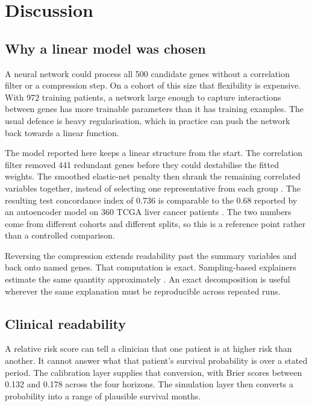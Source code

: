 \documentclass[10pt,a4paper]{article}
\begin{document}
\section{Discussion}

\subsection{Why a linear model was chosen}

A neural network could process all 500 candidate genes without a correlation
filter or a compression step. On a cohort of this size that flexibility is
expensive. With 972 training patients, a network large enough to capture
interactions between genes has more trainable parameters than it has training
examples. The usual defence is heavy regularisation, which in practice can push
the network back towards a linear function.

The model reported here keeps a linear structure from the start. The correlation
filter removed 441 redundant genes before they could destabilise the fitted
weights. The smoothed elastic-net penalty then shrank the remaining correlated
variables together, instead of selecting one representative from each group
\citep{zou2005regularization}. The resulting test concordance index of 0.736 is
comparable to the 0.68 reported by an autoencoder model on 360 TCGA liver cancer
patients \citep{chaudhary2018deep}. The two numbers come from different cohorts
and different splits, so this is a reference point rather than a controlled
comparison.

Reversing the compression extends readability past the summary variables and
back onto named genes. That computation is exact. Sampling-based explainers
estimate the same quantity approximately \citep{lundberg2017unified,
ribeiro2016why}. An exact decomposition is useful wherever the same
explanation must be reproducible across repeated runs.

\subsection{Clinical readability}

A relative risk score can tell a clinician that one patient is at higher risk
than another. It cannot answer what that patient's survival probability is over
a stated period. The calibration layer supplies that conversion, with Brier
scores between 0.132 and 0.178 across the four horizons. The simulation layer
then converts a probability into a range of plausible survival months.
\end{document}
